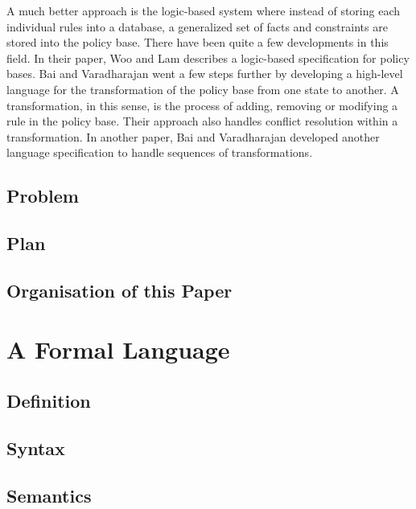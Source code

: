 \documentclass[a4paper]{article}
\begin{document}
      A much better approach is the logic-based system where instead of
      storing each individual rules into a database, a generalized set of
      facts and constraints are stored into the policy base. There have been
      quite a few developments in this field. In their paper, Woo and Lam
      \cite{WL} describes a logic-based specification for policy bases. Bai and
      Varadharajan \cite{BV1} went a few steps further by developing a
      high-level language for the transformation of the policy base from one
      state to another. A transformation, in this sense, is the process of
      adding, removing or modifying a rule in the policy base. Their approach
      also handles conflict resolution within a transformation. In another
      paper, Bai and Varadharajan \cite{BV2} developed another language
      specification to handle sequences of transformations.

    \subsection{Problem}

    \subsection{Plan}

    \subsection{Organisation of this Paper}

    \pagebreak

  \section{A Formal Language}

    \subsection{Definition}

    \subsection{Syntax}

    \subsection{Semantics}

    \pagebreak
\end{document}
